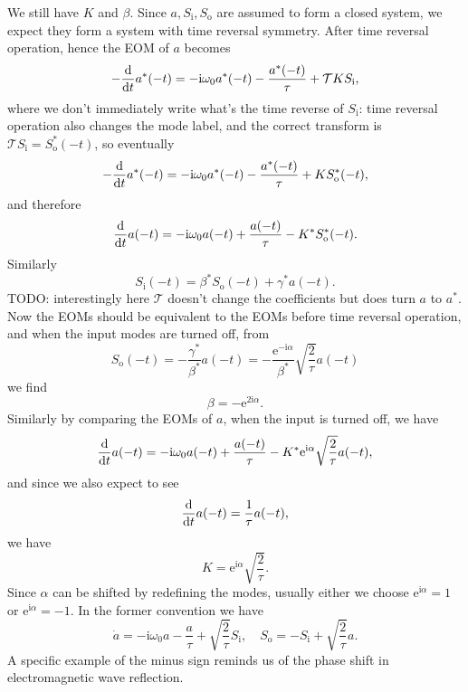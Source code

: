 \documentclass[hyperref, a4paper]{article}
\newcommand*{\ii}{\mathrm{i}}
\newcommand*{\ee}{\mathrm{e}}
\newcommand*{\Si}{S_{\text{i}}}
\newcommand*{\So}{S_{\text{o}}}
\newcommand*{\Tre}{\mathcal{T}}
\begin{document}
We still have $K$ and $\beta$. Since $a, \Si, \So$ are assumed to form a closed system, 
we expect they form a system with time reversal symmetry.
After time  reversal operation, hence the EOM of $a$ becomes 
\begin{equation}
    -\dv{t} a^*(-t) = - \ii \omega_0 a^*(-t) - \frac{a^*(-t)}{\tau} + \Tre{K S_{\text{i}}},
\end{equation} 
where we don't immediately write what's the time reverse of $S_{\text{i}}$:
time reversal operation also changes the mode label, 
and the correct transform is $\Tre{S_{\text{i}}} = \So^*(-t)$, 
so eventually 
\begin{equation}
    -\dv{t} a^*(-t) = - \ii \omega_0 a^*(-t) - \frac{a^*(-t)}{\tau} + K \So^*(-t),
\end{equation}
and therefore 
\begin{equation}
    \dv{t} a(-t) = - \ii \omega_0 a(-t) + \frac{a(-t)}{\tau} - K^* \So^*(-t).
\end{equation}
Similarly 
\begin{equation}
    \Si(-t) = \beta^* \So(-t) + \gamma^* a(-t).
\end{equation}
TODO: interestingly here $\Tre$ doesn't change the coefficients but does turn $a$ to $a^*$.
Now the EOMs should be equivalent to the EOMs before time reversal operation, 
and when the input modes are turned off, from 
\[
    \So(-t) = - \frac{\gamma^*}{\beta^*} a(-t) = - \frac{\ee^{- \ii \alpha}}{\beta^*} \sqrt{\frac{2}{\tau}} a(-t)
\]
we find 
\begin{equation}
    \beta = - \ee^{2 \ii \alpha}.
\end{equation}
Similarly by comparing the EOMs of $a$, when the input is turned off, we have 
\[
    \dv{t} a(-t) = - \ii \omega_0 a(-t) + \frac{a(-t)}{\tau} 
    - K^* \ee^{\ii \alpha} \sqrt{\frac{2}{\tau}} a(-t) ,
\] 
and since we also expect to see 
\[
    \dv{t} a(-t) = \frac{1}{\tau} a(-t),
\]
we have 
\begin{equation}
    K = \ee^{\ii \alpha} \sqrt{\frac{2}{\tau}}.
\end{equation} 
Since $\alpha$ can be shifted by redefining the modes, 
usually either we choose $\ee^{\ii \alpha} = 1$ or $\ee^{\ii \alpha} = -1$.
In the former convention we have 
\begin{equation}
    \dot{a} = - \ii \omega_0 a - \frac{a}{\tau} + \sqrt{\frac{2}{\tau}} \Si, \quad 
    \So = - \Si + \sqrt{\frac{2}{\tau}} a. 
\end{equation}
A specific example of the minus sign reminds us of the phase shift in electromagnetic wave reflection.
\end{document}
